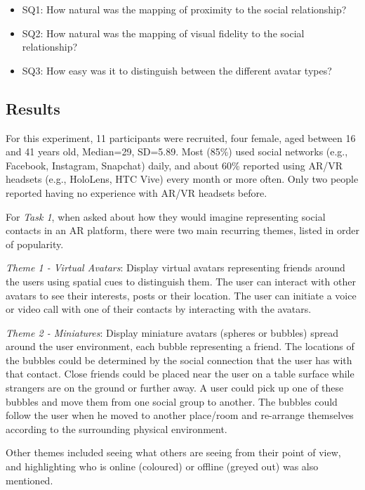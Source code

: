 \begin{itemize}
    \item SQ1: How natural was the mapping of proximity to the social relationship?
    \item SQ2: How natural was the mapping of visual fidelity to the social relationship?
    \item SQ3: How easy was it to distinguish between the different avatar types?
\end{itemize}

\subsection{Results}

For this experiment, 11 participants were recruited, four female, aged between 16 and 41 years old, Median=29, SD=5.89. Most (85\%) used social networks (e.g., Facebook, Instagram, Snapchat) daily, and about 60\% reported using AR/VR headsets (e.g., HoloLens, HTC Vive) every month or more often. Only two people reported having no experience with AR/VR headsets before.

For \textit{Task 1}, when asked about how they would imagine representing social contacts in an AR platform, there were two main recurring themes, listed in order of popularity.

\textit{Theme 1 - Virtual Avatars}: Display virtual avatars representing friends around the users using spatial cues to distinguish them. The user can interact with other avatars to see their interests, posts or their location. The user can initiate a voice or video call with one of their contacts by interacting with the avatars.


\textit{Theme 2 - Miniatures}: Display miniature avatars (spheres or bubbles) spread around the user environment, each bubble representing a friend. The locations of the bubbles could be determined by the social connection that the user has with that contact. Close friends could be placed near the user on a table surface while strangers are on the ground or further away. A user could pick up one of these bubbles and move them from one social group to another. The bubbles could follow the user when he moved to another place/room and re-arrange themselves according to the surrounding physical environment.

Other themes included seeing what others are seeing from their point of view, and highlighting who is online (coloured) or offline (greyed out) was also mentioned.

